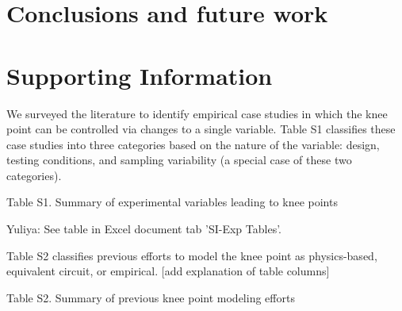 \documentclass{article}
\begin{document}
\section{Conclusions and future work}

\section{Supporting Information}

We surveyed the literature to identify empirical case studies in which the knee point can be controlled via changes to a single variable. Table S1 classifies these case studies into three categories based on the nature of the variable: design, testing conditions, and sampling variability (a special case of these two categories). 


Table S1. Summary of experimental variables leading to knee points


Yuliya: See table in Excel document tab 'SI-Exp Tables'. 


Table S2 classifies previous efforts to model the knee point as physics-based, equivalent circuit, or empirical. [add explanation of table columns]

Table S2. Summary of previous knee point modeling efforts



\end{document}
